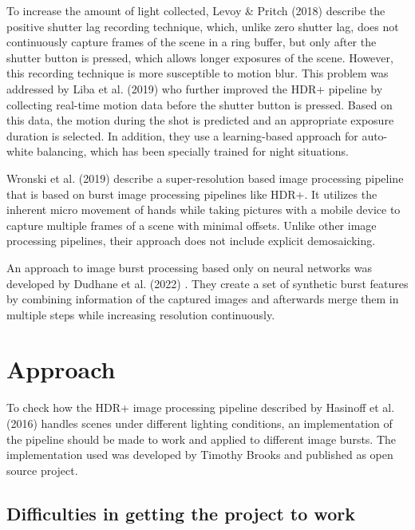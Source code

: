 \documentclass{egpubl}
\begin{document}
To increase the amount of light collected, Levoy {\&} Pritch (2018) \cite{levoy2018psl} describe 
the positive shutter lag recording technique, which, unlike zero shutter lag, does not 
continuously capture frames of the scene in a ring buffer, but only after the shutter button is pressed,
which allows longer exposures of the scene. However, this recording technique is more susceptible to motion blur.
This problem was addressed by Liba et al. (2019) \cite{liba2019handheld} who further improved the HDR+ 
pipeline by collecting real-time motion data before the shutter button is pressed. Based on this data, the motion 
during the shot is predicted and an appropriate exposure duration is selected. In addition, 
they use a learning-based approach for auto-white balancing, which has been specially trained 
for night situations.

Wronski et al. (2019) \cite{Wronski2019superres} describe a super-resolution based image processing pipeline that 
is based on burst image processing pipelines like HDR+. It utilizes the inherent micro movement of hands while
taking pictures with a mobile device to capture multiple frames of a scene with minimal offsets. Unlike other
image processing pipelines, their approach does not include explicit demosaicking.

An approach to image burst processing based only on neural networks was developed by Dudhane et al. (2022)
\cite{Dudhane2022restoration}. They create a set of synthetic burst features by combining information of the
captured images and afterwards merge them in multiple steps while increasing resolution continuously. 

\section{Approach}
\label{sec:approach}

To check how the HDR+ image processing pipeline described by Hasinoff et al. (2016) \cite{Hasinoff2016burst}
handles scenes under different lighting
conditions, an implementation of the pipeline should be made to work and applied to
different image bursts. The implementation used was developed by Timothy Brooks
\cite{Brooks2016git} and published as open source project.

\subsection{Difficulties in getting the project to work}
\label{sec:difficulties}
\end{document}
